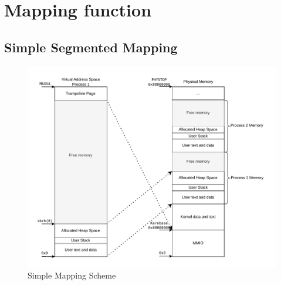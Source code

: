\section{Mapping function}





\subsection{Simple Segmented Mapping}

\begin{figure}[ht!]
    \centering
    \includegraphics[]{figures/simple_mapping.pdf}

    \caption[Simple Mapping Scheme]{Simple Mapping Scheme}
    \label{fig:theory:simplemapping}
\end{figure}